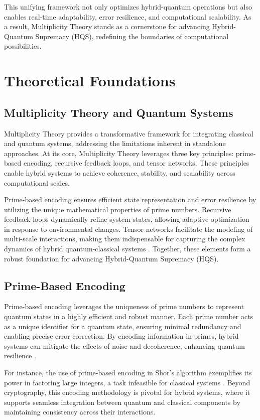 \documentclass{article}
\theoremstyle{plain}
\begin{document}
This unifying framework not only optimizes hybrid-quantum operations but also enables real-time adaptability, error resilience, and computational scalability. As a result, Multiplicity Theory stands as a cornerstone for advancing Hybrid-Quantum Supremacy (HQS), redefining the boundaries of computational possibilities.


\section{Theoretical Foundations}

\subsection{Multiplicity Theory and Quantum Systems}
Multiplicity Theory provides a transformative framework for integrating classical and quantum systems, addressing the limitations inherent in standalone approaches. At its core, Multiplicity Theory leverages three key principles: prime-based encoding, recursive feedback loops, and tensor networks. These principles enable hybrid systems to achieve coherence, stability, and scalability across computational scales.

Prime-based encoding ensures efficient state representation and error resilience by utilizing the unique mathematical properties of prime numbers. Recursive feedback loops dynamically refine system states, allowing adaptive optimization in response to environmental changes. Tensor networks facilitate the modeling of multi-scale interactions, making them indispensable for capturing the complex dynamics of hybrid quantum-classical systems \cite{zhang2021hybrid}. Together, these elements form a robust foundation for advancing Hybrid-Quantum Supremacy (HQS).

\subsection{Prime-Based Encoding}
Prime-based encoding leverages the uniqueness of prime numbers to represent quantum states in a highly efficient and robust manner. Each prime number acts as a unique identifier for a quantum state, ensuring minimal redundancy and enabling precise error correction. By encoding information in primes, hybrid systems can mitigate the effects of noise and decoherence, enhancing quantum resilience \cite{preskill2018quantum}.

For instance, the use of prime-based encoding in Shor's algorithm exemplifies its power in factoring large integers, a task infeasible for classical systems \cite{shor1994algorithms}. Beyond cryptography, this encoding methodology is pivotal for hybrid systems, where it supports seamless integration between quantum and classical components by maintaining consistency across their interactions.
\end{document}
